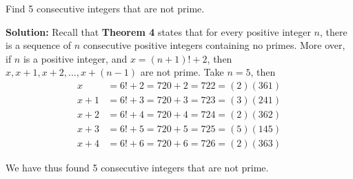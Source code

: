 Find 5 consecutive integers that are not prime.

\doublespacing

\textbf{Solution:} Recall that \textbf{Theorem 4} states that for every positive integer $n$, there is a sequence of $n$ consecutive positive integers containing no primes. More over, if $n$ is a positive integer, and $x=(n+1)!+2$, then $x,x+1,x+2,...,x+(n-1)$ are not prime. Take $n=5$, then
\begin{align*}
    x   &= 6!+2 = 720 + 2 = 722=(2)(361)\\
    x+1 &= 6!+3 = 720 + 3 = 723=(3)(241)\\
    x+2 &= 6!+4 = 720 + 4 = 724=(2)(362)\\
    x+3 &= 6!+5 = 720 + 5 = 725=(5)(145)\\
    x+4 &= 6!+6 = 720 + 6 = 726=(2)(363)
\end{align*}

We have thus found 5 consecutive integers that are not prime.

\pagebreak